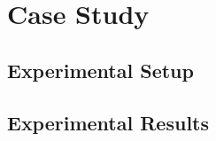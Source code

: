 \section{Case Study} \label{sec:case}

\subsection{Experimental Setup}

\subsection{Experimental Results}
